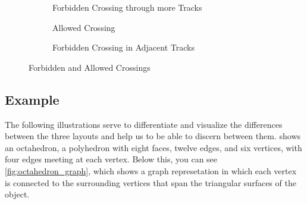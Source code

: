 \documentclass[bachelor, english]{algothesis}
\begin{document}
\begin{figure}[ht]
    \centering

    \begin{subfigure}[b]{0.45\linewidth}
        
        \caption{Forbidden Crossing through more Tracks}
        \label{fig:verbot2}
    \end{subfigure}
    \hfill 
    \begin{subfigure}[b]{0.45\linewidth}
        
        \caption{Allowed Crossing}
        \label{fig:erlaubt}
    \end{subfigure}

    \begin{subfigure}[b]{0.9\linewidth}
        \centering
        
        \caption{Forbidden Crossing in Adjacent Tracks}
        \label{fig:verbot1}
    \end{subfigure}

    \caption{Forbidden and Allowed Crossings}
    \label{fig:crossings}
\end{figure}

\subsection{Example}
The following illustrations serve to differentiate and visualize the differences between the three layouts and help us to be able to discern between them.  shows an octahedron, a polyhedron with eight faces, twelve edges, and six vertices, with four edges meeting at each vertex. Below this, you can see \cref{fig:octahedron_graph}, which shows a graph represetation in which each vertex is connected to the surrounding vertices that span the triangular surfaces of the object.
\end{document}

